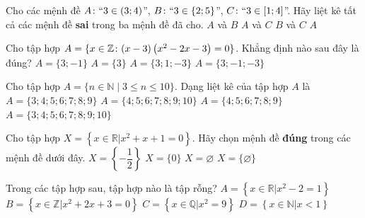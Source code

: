 \begin{ex}%
	Cho các mệnh đề $A\colon ``3\in (3; 4)$'', $B\colon ``3\in \left\{2; 5\right\}$'', $C\colon ``3\in [1; 4]$''.  Hãy liệt kê tất cả các mệnh đề \textbf{sai} trong ba mệnh đề đã cho.
	\choice 
		 {\True $A$ và $B$}
		{$A$ và  $C$}
		{$B$ và  $C$}
		 {$A$}
\end{ex}

\begin{ex}%
	Cho tập hợp $A=\{x\in \Bbb{Z}\colon (x-3)\left(x^2-2x-3\right)=0\}$. Khẳng định nào  sau đây là đúng?
	 \choice
		 {\True $A=\{3;-1\}$}
		{$A=\{3\}$} 
		{$A=\{3;1;-3\}$} 
		 {$A=\{3;-1;-3\}$}
\end{ex}

\begin{ex}%
	Cho tập hợp $A = \{n \in \mathbb{N} \mid 3 \le n  \le 10\}$. Dạng liệt kê của tập hợp $A$ là
	 \choice
		 {$A = \{3;4;5;6;7;8;9\}$}
		{$A =  \{4;5;6;7;8;9;10\}$}
		{$A = \{4;5;6;7;8;9\}$} 
		{\True $A  = \{3;4;5;6;7;8;9;10\}$}
\end{ex}

\begin{ex}%
	Cho tập hợp $X=\left\{x\in \mathbb{R}\big|x^2+x+1=0\right\} $. Hãy chọn mệnh đề \textbf{đúng} trong  các mệnh đề dưới đây.
	\choice 
		 {$X=\left\{-\dfrac{1}{2}\right\}$}
		{$X=\lbrace 0\rbrace$} 
		{\True  $X=\varnothing$}
		{$X=\lbrace  \varnothing\rbrace$}
\end{ex}

\begin{ex}%
	Trong các tập hợp sau, tập hợp  nào là tập rỗng?
	 \choice
		{$A =  \left\{x \in \mathbb{R}\big| x^2 - 2 = 1\right\}$}
		{\True $B = \left\{x \in \mathbb{Z}\big| x^2 +  2x + 3 = 0\right\}$}
		{$C =  \left\{x \in \mathbb{Q}\big| x^2 = 9\right\}$}
		{$D  = \left\{x \in \mathbb{N}\big| x < 1\right\}$}
\end{ex}

